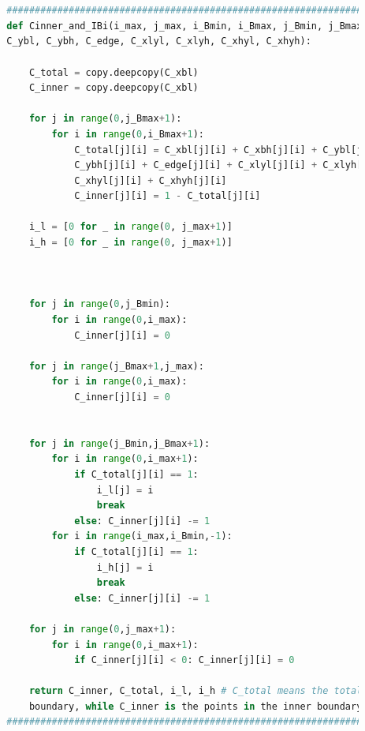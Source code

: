 \documentclass[12pt]{article}
\begin{document}
\begin{scriptsize}
\begin{lstlisting}[language=python,caption={Python code--Functions for Grid Generator}]
        
        
        
        
        
        
        
        ##########################################################################################
        def Cinner_and_IBi(i_max, j_max, i_Bmin, i_Bmax, j_Bmin, j_Bmax, C_xbl, C_xbh, \
        C_ybl, C_ybh, C_edge, C_xlyl, C_xlyh, C_xhyl, C_xhyh):
        
            C_total = copy.deepcopy(C_xbl)
            C_inner = copy.deepcopy(C_xbl)
        
            for j in range(0,j_Bmax+1):
                for i in range(0,i_Bmax+1):
                    C_total[j][i] = C_xbl[j][i] + C_xbh[j][i] + C_ybl[j][i] + \
                    C_ybh[j][i] + C_edge[j][i] + C_xlyl[j][i] + C_xlyh[j][i] + \
                    C_xhyl[j][i] + C_xhyh[j][i]
                    C_inner[j][i] = 1 - C_total[j][i]
        
            i_l = [0 for _ in range(0, j_max+1)]
            i_h = [0 for _ in range(0, j_max+1)]
        
        
        
            for j in range(0,j_Bmin):
                for i in range(0,i_max):
                    C_inner[j][i] = 0
        
            for j in range(j_Bmax+1,j_max):
                for i in range(0,i_max):
                    C_inner[j][i] = 0
        
            
            for j in range(j_Bmin,j_Bmax+1):
                for i in range(0,i_max+1):
                    if C_total[j][i] == 1:
                        i_l[j] = i
                        break
                    else: C_inner[j][i] -= 1
                for i in range(i_max,i_Bmin,-1):
                    if C_total[j][i] == 1:
                        i_h[j] = i
                        break
                    else: C_inner[j][i] -= 1
        
            for j in range(0,j_max+1):
                for i in range(0,i_max+1):
                    if C_inner[j][i] < 0: C_inner[j][i] = 0
            
            return C_inner, C_total, i_l, i_h # C_total means the total inner \
            boundary, while C_inner is the points in the inner boundary
        ##########################################################################################
        
        
        
    \end{lstlisting}
\end{scriptsize}
\end{document}
